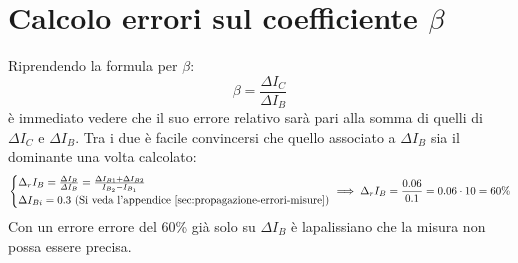 \documentclass[../main.tex]{subfiles}
\begin{document}
\section{Calcolo errori sul coefficiente $\beta$}
  \label{sec:errori-beta}
  Riprendendo la formula per $\beta$:
  \begin{equation*}
    \beta = \frac{\varDelta I_C}{\varDelta I_B}
  \end{equation*}
  è immediato vedere che il suo errore relativo sarà pari alla somma
  di quelli di $\varDelta I_C$ e $\varDelta I_B$.
  Tra i due è facile convincersi che quello associato a
  $\varDelta I_B$ sia il dominante una volta calcolato:
  \begin{equation*}
    \left\{
    \begin{array}{@{}l@{}}
      \Delta_r I_B = \frac{\Delta I_B}{\varDelta I_B} = \frac{\Delta I_{B1} + \Delta I_{B2}}{I_{B_2} - I_{B_1}} \\[1ex]
      \Delta I_{Bi} = 0.3 \text{ (Si veda l'appendice~\ref{sec:propagazione-errori-misure})}
    \end{array}\right. \implies
    \Delta_r I_B = \frac{0.06}{0.1} = 0.06 \cdot 10 = 60\%
  \end{equation*}
  Con un errore errore del 60\% già solo su $\varDelta I_B$ è
  lapalissiano che la misura non possa essere precisa.
\end{document}
